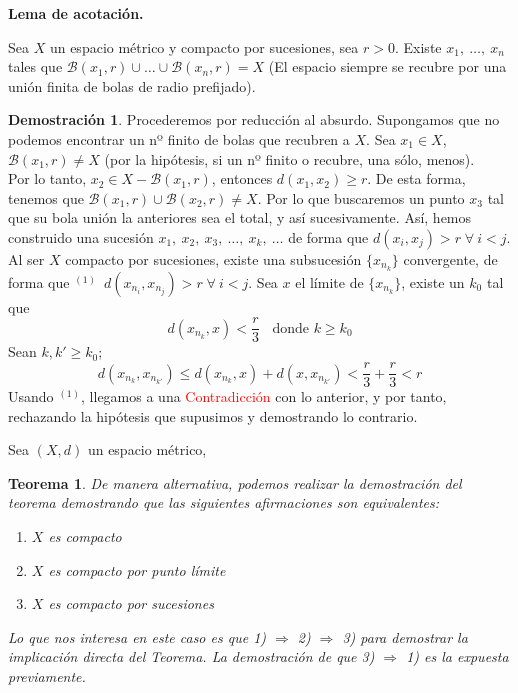 \documentclass[12pt,twoside]{report}
\newcommand\mc[1]{\mathcal{#1}}
\theoremstyle{azul}
\newtheorem*{teox}{Teorema}
\theoremstyle{azul2}
\theoremstyle{plain}
\theoremstyle{definition}
\newtheorem*{dem}{Demostración}
\theoremstyle{remark}
\begin{document}
\textbf{Lema de acotación.} 
\begin{tcolorbox}
Sea $X$ un espacio m{\'e}trico y compacto por sucesiones, sea $r>0$. Existe $x_1, \: \ldots, \: x_n$ tales que $\mc{B}(x_1, r) \cup \ldots \cup \mc{B}(x_n, r) = X$ (El espacio siempre se recubre por una unión finita de bolas de radio prefijado).
\end{tcolorbox}
\begin{dem}
Procederemos por reducción al absurdo. Supongamos que no podemos encontrar un nº finito de bolas que recubren a $X$. Sea $x_1 \in X$, $\mc{B}(x_1,r) \neq X$ (por la hipótesis, si un nº finito o recubre, una sólo, menos). \\
Por lo tanto, $x_2 \in X - \mc{B}(x_1,r)$, entonces $d(x_1, x_2) \geq r$. De esta forma, tenemos que $\mc{B}(x_1,r) \cup \mc{B}(x_2,r) \neq X$. Por lo que buscaremos un punto $x_3$ tal que su bola unión la anteriores sea el total, y así sucesivamente. Así, hemos construido una sucesión $x_1, \: x_2, \: x_3, \: \ldots, \: x_k, \: \ldots$ de forma que $d(x_i, x_j) > r \; \forall \: i<j$. \\
Al ser $X$ compacto por sucesiones, existe una subsucesión $\{ x_{n_k}\}$ convergente, de forma que $ ^{(1)} \; \: d(x_{n_i}, x_{n_j}) > r  \; \forall \: i<j$. Sea $x$ el límite de $\{ x_{n_k}\}$, existe un $k_0$ tal que 
$$d(x_{n_k},x)<\dfrac{r}{3} \; \; \text{ donde } k \geq k_0$$
Sean $k,k' \geq k_0$;
$$d(x_{n_k}, x_{n_{k'}}) \leq d(x_{n_k}, x) + d(x, x_{n_{k'}}) < \dfrac{r}{3} + \dfrac{r}{3}<r$$
Usando $^{(1)}$, llegamos a una \textcolor{red}{Contradicción} con lo anterior, y por tanto, rechazando la hipótesis que supusimos y demostrando lo contrario.
\end{dem}
Sea $(X,d)$ un espacio m{\'etrico}, 
\begin{teox}
De manera  alternativa, podemos realizar la demostración del teorema demostrando que las siguientes afirmaciones son equivalentes: \vspace{-2mm}
\begin{enumerate}[1)]
    \item $X$ es compacto
    \item $X$ es compacto por punto límite
    \item $X$ es compacto por sucesiones
\end{enumerate}
Lo que nos interesa en este caso es que 1) $\Rightarrow$ 2) $\Rightarrow$ 3) para demostrar la implicación directa del Teorema. La demostración de que 3) $\Rightarrow$ 1) es la expuesta previamente.
\end{teox}
\end{document}
